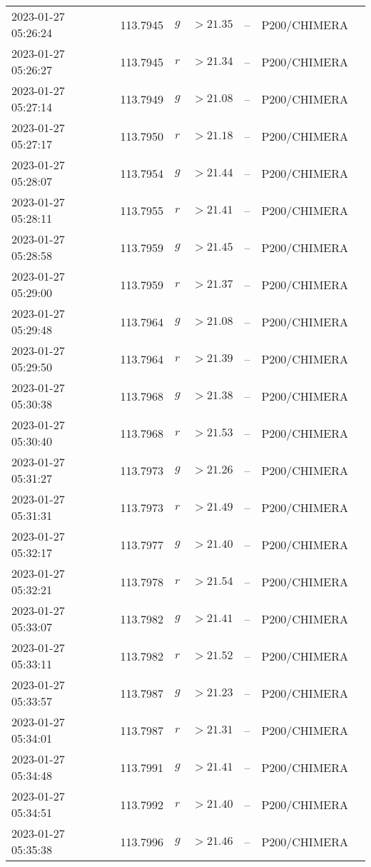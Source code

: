 \documentclass{nature_plusfigure}
\begin{document}
\begin{supplement}
\begin{center}
\begin{longtable}{lllllll}
2023-01-27 05:26:24 & 113.7945 & $g$ & $>21.35$ & -- & P200/CHIMERA &  \\ 
2023-01-27 05:26:27 & 113.7945 & $r$ & $>21.34$ & -- & P200/CHIMERA &  \\ 
2023-01-27 05:27:14 & 113.7949 & $g$ & $>21.08$ & -- & P200/CHIMERA &  \\ 
2023-01-27 05:27:17 & 113.7950 & $r$ & $>21.18$ & -- & P200/CHIMERA &  \\ 
2023-01-27 05:28:07 & 113.7954 & $g$ & $>21.44$ & -- & P200/CHIMERA &  \\ 
2023-01-27 05:28:11 & 113.7955 & $r$ & $>21.41$ & -- & P200/CHIMERA &  \\ 
2023-01-27 05:28:58 & 113.7959 & $g$ & $>21.45$ & -- & P200/CHIMERA &  \\ 
2023-01-27 05:29:00 & 113.7959 & $r$ & $>21.37$ & -- & P200/CHIMERA &  \\ 
2023-01-27 05:29:48 & 113.7964 & $g$ & $>21.08$ & -- & P200/CHIMERA &  \\ 
2023-01-27 05:29:50 & 113.7964 & $r$ & $>21.39$ & -- & P200/CHIMERA &  \\ 
2023-01-27 05:30:38 & 113.7968 & $g$ & $>21.38$ & -- & P200/CHIMERA &  \\ 
2023-01-27 05:30:40 & 113.7968 & $r$ & $>21.53$ & -- & P200/CHIMERA &  \\ 
2023-01-27 05:31:27 & 113.7973 & $g$ & $>21.26$ & -- & P200/CHIMERA &  \\ 
2023-01-27 05:31:31 & 113.7973 & $r$ & $>21.49$ & -- & P200/CHIMERA &  \\ 
2023-01-27 05:32:17 & 113.7977 & $g$ & $>21.40$ & -- & P200/CHIMERA &  \\ 
2023-01-27 05:32:21 & 113.7978 & $r$ & $>21.54$ & -- & P200/CHIMERA &  \\ 
2023-01-27 05:33:07 & 113.7982 & $g$ & $>21.41$ & -- & P200/CHIMERA &  \\ 
2023-01-27 05:33:11 & 113.7982 & $r$ & $>21.52$ & -- & P200/CHIMERA &  \\ 
2023-01-27 05:33:57 & 113.7987 & $g$ & $>21.23$ & -- & P200/CHIMERA &  \\ 
2023-01-27 05:34:01 & 113.7987 & $r$ & $>21.31$ & -- & P200/CHIMERA &  \\ 
2023-01-27 05:34:48 & 113.7991 & $g$ & $>21.41$ & -- & P200/CHIMERA &  \\ 
2023-01-27 05:34:51 & 113.7992 & $r$ & $>21.40$ & -- & P200/CHIMERA &  \\ 
2023-01-27 05:35:38 & 113.7996 & $g$ & $>21.46$ & -- & P200/CHIMERA &  \\ 

\end{longtable}
\end{center}
\end{supplement}
\end{document}
